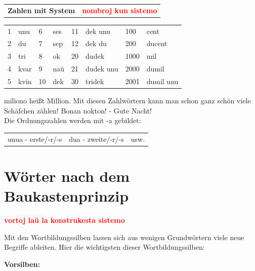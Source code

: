 \clearpage

\vspace{-.6cm}

\begin{tabular}{lr}
	\textbf{\large{Zahlen mit System}} & \textbf{\large \textcolor{red}{nombroj kun sistemo}}
\end{tabular}

\vspace{-.0cm}

\begingroup
\setlength{\tabcolsep}{5pt} %
\renewcommand{\arraystretch}{0.9} %
\begin{tabular}{llllllll}
1 &unu & 6 &ses & 11 &dek unu &  100& cent \\
2 &du  & 7 &sep & 12 &dek du& 200& ducent \\
3 &tri & 8 &ok  & 20 &dudek & 1000& mil \\
4 &kvar& 9 &naŭ & 21 &dudek unu & 2000& dumil \\
5 &kvin& 10 &dek& 30 &tridek& 2001& dumil unu
\end{tabular}
\endgroup

miliono heißt Million. Mit diesen Zahlwörtern kann man schon ganz schön viele Schäfchen zählen!
Bonan nokton! - Gute Nacht! \\
Die Ordnungszahlen werden mit -a gebildet:

\begin{tabular}{lll}
unua - erste/-r/-s & dua - zweite/-r/-s & usw. 
\end{tabular}

\vspace{-.6cm}

\section{Wörter nach dem Baukastenprinzip}

\vspace{-.2cm}

\begin{flushright}
\textbf{\large \textcolor{red}{vortoj laŭ la konstrukesta sistemo}}
\end{flushright}

\vspace{-.1cm}

Mit den Wortbildungssilben lassen sich aus wenigen Grundwörtern viele neue Begriffe ableiten. Hier die wichtigsten dieser Wortbildungssilben:

\textbf{Vorsilben:}

